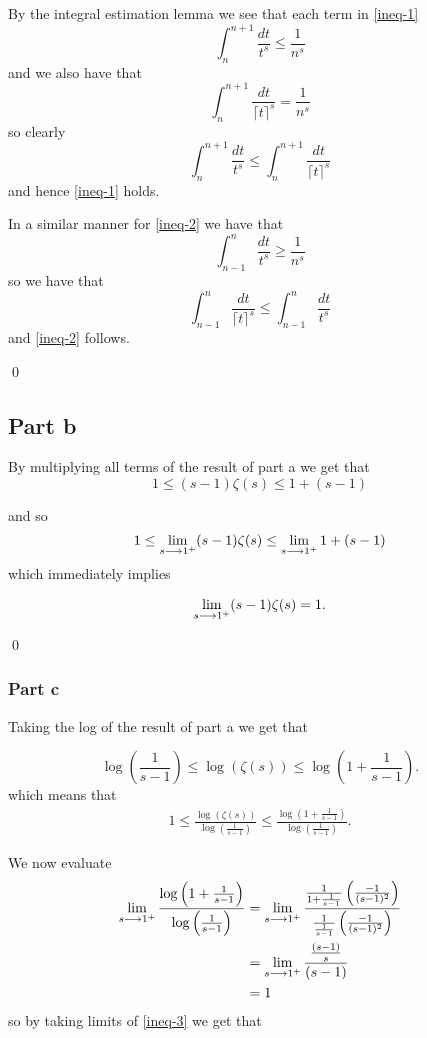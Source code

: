 \documentclass{unswmaths}
\begin{document}
By the integral estimation lemma we see that each term in \eqref{ineq-1}
$$
	\int_{n}^{n+1} \frac{dt}{t^s} \leq \frac{1}{n^s}
$$
and we also have that
$$
	\int_{n}^{n+1} \frac{dt}{\lceil t \rceil^s} = \frac{1}{n^s}
$$
so clearly 
$$
	\int_{n}^{n+1} \frac{dt}{t^s} \leq \int_{n}^{n+1} \frac{dt}{\lceil t \rceil^s}
$$
and hence \eqref{ineq-1} holds.

In a similar manner for \eqref{ineq-2} we have that 
$$
	\int_{n-1}^n \frac{dt}{t^s} \geq \frac{1}{n^s}
$$
so we have that
$$
	\int_{n-1}^{n} \frac{dt}{\lceil t \rceil^s} \leq \int_{n-1}^n \frac{dt}{t^s}
$$
and \eqref{ineq-2} follows.

\qed

\subsection*{Part b}

By multiplying all terms of the result of part a we get that
$$
	1 \leq (s-1)\zeta(s) \leq 1 + (s-1)
$$

and so
$$
	1 \leq \lim_{s \longrightarrow 1^+} (s-1)\zeta(s) \leq \lim_{s\longrightarrow 1^+} 1 + (s-1)
$$
which immediately implies

$$
	\lim_{s \longrightarrow 1^+} (s-1) \zeta(s) = 1.
$$

\qed

\subsubsection*{Part c}

Taking the log of the result of part a we get that

$$
	\log(\frac{1}{s-1}) \leq \log(\zeta(s)) \leq \log(1 + \frac{1}{s-1}).
$$
which means that
\begin{align}
	\label{ineq-3}
	1 \leq \frac{\log(\zeta(s))}{\log\left( \frac{1}{s-1}\right)} \leq \frac{\log \left( 1 + \frac{1}{s-1} \right)}{\log\left( \frac{1}{s-1}\right)}.
\end{align}

We now evaluate
\begin{align*}
	\lim_{s \longrightarrow 1^+} \frac{\log \left( 1 + \frac{1}{s-1} \right)}{\log\left( \frac{1}{s-1}\right)} &= \lim_{s \longrightarrow 1^+}\frac{\frac{1}{1+\frac{1}{s-1}}\left( \frac{-1}{(s-1)^2}\right)}{\frac{1}{\frac{1}{s-1}}\left( \frac{-1}{(s-1)^2}\right)} \\
		&= \lim_{s \longrightarrow 1^+} \frac{\frac{(s-1)}{s}}{(s-1)} \\
		&= 1
\end{align*}
so by taking limits of \eqref{ineq-3} we get that 
\end{document}
